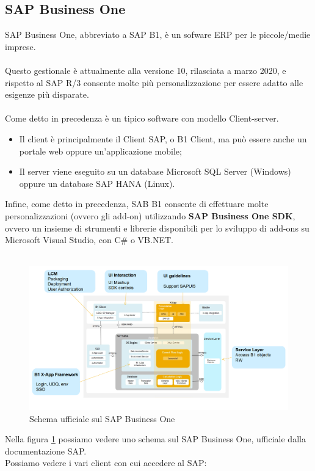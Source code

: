 \subsection{SAP Business One}
SAP Business One, abbreviato a SAP B1, è un sofware ERP per le piccole/medie imprese.
\\\\Questo gestionale è attualmente alla versione 10, rilasciata a marzo 2020, e rispetto al SAP R/3 consente molte più personalizzazione per essere adatto alle esigenze più disparate.
\\\\Come detto in precedenza è un tipico software con modello Client-server.
\begin{itemize}
	\item Il client è principalmente il Client SAP, o B1 Client, ma può essere anche un portale web oppure un'applicazione mobile;
	\item Il server viene eseguito su un database Microsoft SQL Server (Windows) oppure un database SAP HANA (Linux).\\
\end{itemize}
Infine, come detto in precedenza, SAB B1 consente di effettuare molte personalizzazioni (ovvero gli add-on) utilizzando \textbf{SAP Business One SDK}, ovvero un insieme di strumenti e librerie disponibili per lo sviluppo di add-ons su Microsoft Visual Studio, con C\# o VB.NET.\\\\
\begin{figure}[!h] 
	\includegraphics[scale = 0.4, left]{immagini/erp-sap-inside.png} 
	\caption{Schema ufficiale sul SAP Business One}
	\label{fig:2-3}
\end{figure}
\newpage

	Nella figura \ref{fig:2-3} possiamo vedere uno schema sul SAP Business One, ufficiale dalla documentazione SAP.\\
	Possiamo vedere i vari client con cui accedere al SAP:


